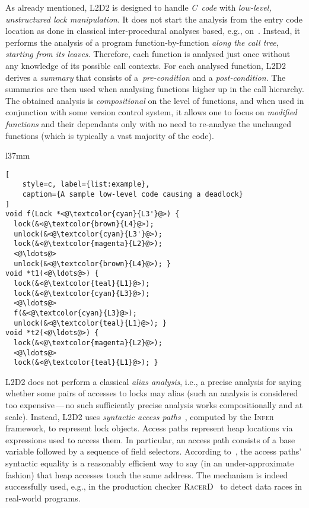 \documentclass[runningheads]{llncs}
\newcommand{\LLDD}{\textsc{L2D2}\xspace} %
\newcommand{\Infer}{\textsc{Infer}\xspace}
\begin{document}
\enlargethispage{6mm}

As already mentioned, \LLDD is designed to handle \emph{C~code} with
\emph{low-level, unstructured lock manipulation}. It does not start the analysis
from the entry code location as done in classical inter-procedural analyses
based, e.g., on~\cite{dfagr95}. Instead, it performs the analysis of a program
function-by-function \emph{along the call tree}, \emph{starting from its
leaves}.
%
%
Therefore, each function is analysed just once without any knowledge of its
possible call contexts. For each analysed function, \LLDD derives a
\emph{summary} that consists of a~\emph{pre-condition} and a
\emph{post-condition}. The summaries are then used when analysing functions
higher up in the call hierarchy. The obtained analysis is \emph{compositional}
on the level of functions, and when used in conjunction with some version
control system, it allows one to focus on \emph{modified functions} and their
dependants only with no need to re-analyse the unchanged functions (which is
typically a vast majority of the code).
%

\begin{wrapfigure}{l}{37mm}
\vspace*{-10mm}
\begin{lstlisting}[
    style=c, label={list:example},
    caption={A sample low-level code causing a deadlock}
]
void f(Lock *<@\textcolor{cyan}{L3'}@>) {
  lock(&<@\textcolor{brown}{L4}@>);
  unlock(&<@\textcolor{cyan}{L3'}@>);
  lock(&<@\textcolor{magenta}{L2}@>);
  <@\ldots@>
  unlock(&<@\textcolor{brown}{L4}@>); }
void *t1(<@\ldots@>) {
  lock(&<@\textcolor{teal}{L1}@>);
  lock(&<@\textcolor{cyan}{L3}@>);
  <@\ldots@>
  f(&<@\textcolor{cyan}{L3}@>);
  unlock(&<@\textcolor{teal}{L1}@>); }
void *t2(<@\ldots@>) {
  lock(&<@\textcolor{magenta}{L2}@>);
  <@\ldots@>
  lock(&<@\textcolor{teal}{L1}@>); }
\end{lstlisting}
\vspace*{-10mm}
\end{wrapfigure}

\LLDD does not perform a classical \emph{alias analysis}, i.e., a precise
analysis for saying whether some pairs of accesses to locks may alias (such an
analysis is considered too expensive\,---\,no such sufficiently precise analysis
works compositionally and at scale).
%
Instead, \LLDD uses \emph{syntactic access paths}~\cite{ap15}, computed by the
\Infer framework, to represent lock objects. Access paths represent heap
locations via expressions used to access them. In particular, an access path
consists of a base variable followed by a sequence of field selectors.
%
According to~\cite{racerD18}, the access paths' syntactic equality is a
reasonably efficient way to say (in an under-approximate fashion) that heap
accesses touch the same address. The mechanism is indeed successfully used,
e.g., in the production checker \textsc{RacerD}~\cite{racerD18} to detect data
races in real-world programs.
\end{document}
